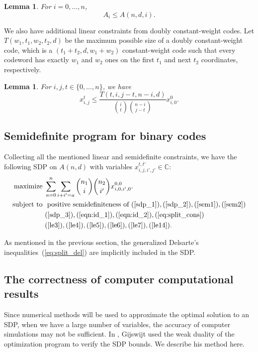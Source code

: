 \documentclass[final,onecolumn]{IEEEtran}
\newtheorem{lemmaenv}[definitionenv]{Lemma}
\newenvironment{lemma}{\begin{lemmaenv}\rm}{\end{lemmaenv}}
\theoremstyle{definition}
\begin{document}
\begin{lemma}\cite[ (25)]{Sch05}
	For $i = 0, \dots, n$,
	\begin{equation}
		\label{le7}
		A_{i} \leq A(n, d, i).
	\end{equation}
\end{lemma}
	
We also have additional linear constraints from doubly constant-weight codes. Let $T(w_{1}, t_{1}, w_{2}, t_{2}, d)$ be the maximum possible size of a doubly constant-weight code, which is a $(t_{1}+t_{2}, d, w_{1}+w_{2})$ constant-weight code such that every codeword has exactly $w_{1}$ and $w_{2}$ ones on the first $t_{1}$ and next $t_{2}$  coordinates, respectively.
	
\begin{lemma}
\cite[Theorem $3$]{KT13}
	For $i, j, t \in \{0, \dots, n\}$, we have
	\begin{equation}
		\label{le14}
		x_{i, j}^{t} \leq \frac{T(t, i, j-t, n-i, d)}{\binom{i}{t} \binom{n-i}{j-t}}x_{i, 0}^{0}.
	\end{equation}
\end{lemma}
	
\subsection{Semidefinite program for binary codes}
Collecting all the mentioned linear and semidefinite constraints, we have the following SDP on $A(n,d)$ with variables $ x_{i, j,i',j'}^{t,t'} \in\mathbb{C}$:
\begin{align}
	{\rm maximize\ } &\sum_{a = 0}^{n} \sum_{i+i' = a} \binom{n_{1}}{i}\binom{n_{2}}{i'} x_{i, 0, i', 0}^{0, 0}.  \notag\\
	{\rm subject\ to\ }       &  \mbox{ positive semidefiniteness of }(\ref{sdp_1}), (\ref{sdp_2}),(\ref{sem1}), (\ref{sem2}) \label{eq:main_SDP} 
	\\ & (\ref{sdp_3}),(\ref{eqn:id_1}), (\ref{eqn:id_2}), (\ref{eq:split_cons})  \notag \\
	& (\ref{le3}), (\ref{le4}), (\ref{le5}), (\ref{le6}), (\ref{le7}), (\ref{le14}).    \notag 
\end{align}
	
As mentioned in the previous section, the generalized Delsarte's inequalities~(\ref{eq:split_del}) are implicitly included in the SDP.
	

	
\subsection{The correctness of computer computational results}
\label{subsec:err}
Since numerical methods will be used to approximate the optimal solution to an SDP, when we have a large number of variables, the accuracy of computer simulations may not be sufficient. In \cite{Gij05}, Gijswijt used the weak duality of the optimization program to verify the SDP bounds. We describe his method here.
	
\end{document}
